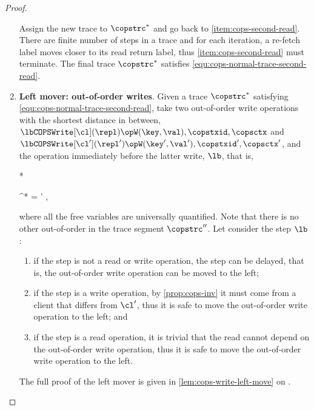 \begin{proof}
\begin{enumerate}
    Assign the new trace to \( \copstrc^* \) and go back to \cref{item:cops-second-read}.
    There are finite number of steps in a trace 
    and for each iteration, a re-fetch label moves closer to its read return label,
    thus \cref{item:cops-second-read} must terminate.
    The final trace \( \copstrc^* \) satisfies \cref{equ:cops-normal-trace-second-read}.

\item{\textbf{Left mover: out-of-order writes}.} \label{item:cops-write}
    Given a trace \( \copstrc^* \) satisfying \cref{equ:cops-normal-trace-second-read},
    take two out-of-order write operations with the shortest distance in between,
    \( \lbCOPSWrite[\cl](\repl){\opW(\key,\val), \copstxid, \copsctx } \) and
    \( \lbCOPSWrite[\cl'](\repl'){\opW(\key',\val'), \copstxid', \copsctx' } \),
    and the operation immediately before the latter write, \( \lb \),
    that is,
    \begin{Formulae}*
    \begin{Formula}
        \copstrc^* = 
        \land \copstxid' \copstxidleq \copstxid ,
    \end{Formula}
    \end{Formulae}
    where all the free variables are universally quantified.
    Note that there is no other out-of-order in the trace segment \( \copstrc'' \).
    Let consider the step \( \lb \):
    \begin{enumerate}
    \item if the step is not a read or write operation, 
    the step can be delayed, that is, the out-of-order write operation can be moved to the left;
    \item if the step is a write operation,
    by \cref{prop:cops-inv} it must come from a client that differs from \( \cl' \),
    thus it is safe to move the out-of-order write operation to the left; and 
    \item  if the step is a read operation, 
    it is trivial that 
    the read cannot depend on the out-of-order write operation,
    thus it is safe to move the out-of-order write operation to the left.
    \end{enumerate}
    The full proof of the left mover is given in \cref{lem:cops-write-left-move} on \pageref{lem:cops-write-left-move}.


\end{enumerate}
\end{proof}
